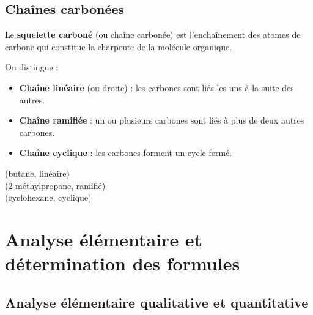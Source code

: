 \subsection{Chaînes carbonées}

\begin{definition}
Le \textbf{squelette carboné} (ou chaîne carbonée) est l'enchaînement des atomes de carbone qui constitue la charpente de la molécule organique.
\end{definition}

\begin{propriete}
On distingue :
\begin{itemize}
    \item \textbf{Chaîne linéaire} (ou droite) : les carbones sont liés les uns à la suite des autres.
    \item \textbf{Chaîne ramifiée} : un ou plusieurs carbones sont liés à plus de deux autres carbones.
    \item \textbf{Chaîne cyclique} : les carbones forment un cycle fermé.
\end{itemize}
\end{propriete}

\begin{exemple}
\begin{center}
\begin{illus}
 \quad (butane, linéaire)\\[4pt]
 \quad (2-méthylpropane, ramifié)\\[4pt]
 \quad (cyclohexane, cyclique)
\end{illus}
\end{center}
\end{exemple}

\section{Analyse élémentaire et détermination des formules}

\subsection{Analyse élémentaire qualitative et quantitative}

